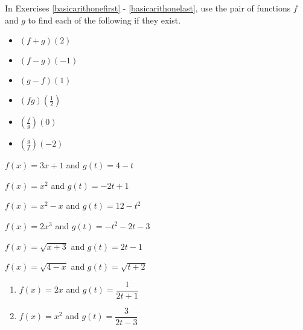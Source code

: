 \documentclass{ximera}
\begin{document}
	\author{Stitz-Zeager}



\label{ExercisesforFunctionArithmetic}

\begin{question}
    
In Exercises \ref{basicarithonefirst} - \ref{basicarithonelast}, use the pair of functions $f$ and $g$ to find each of the following  if they exist.


\begin{itemize}
\item  $(f+g)(2)$ 
\item  $(f-g)(-1)$
\item  $(g-f)(1)$
\item  $(fg)\left(\frac{1}{2}\right)$
\item  $\left(\frac{f}{g}\right)(0)$
\item  $\left(\frac{g}{f}\right)\left(-2\right)$
\end{itemize}

\begin{problem}\label{basicarithonefirst}
$f(x) = 3x+1$ and  $g(t) = 4-t$ 
\end{problem}

\begin{problem}
$f(x) = x^2$ and $g(t) = -2t+1$
\end{problem}

\begin{problem}
$f(x) = x^2 - x$ and  $g(t) = 12-t^2$
\end{problem}

\begin{problem}
$f(x) = 2x^3$ and $g(t) = -t^2-2t-3$
\end{problem}

\begin{problem}
$f(x) = \sqrt{x+3}$ and  $g(t) = 2t-1$
\end{problem}


\item  $f(x) = \sqrt{4-x}$ and $g(t) = \sqrt{t+2}$



\begin{enumerate}
\setcounter{enumi}{\value{HW}}

\item  $f(x) = 2x$ and  $g(t) = \dfrac{1}{2t+1}$
\item  $f(x) = x^2$ and $g(t) = \dfrac{3}{2t-3}$


\end{enumerate}
\end{question}
\end{document}
